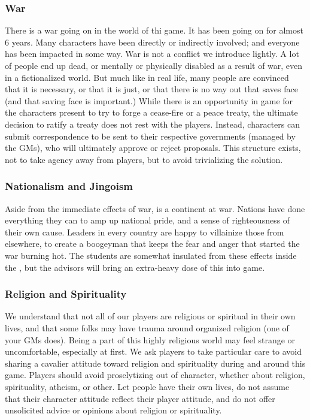 \documentclass[sheet]{GL2020}
\begin{document}
\subsubsection{War}
There is a war going on in the world of thi game. It has been going on for almost 6 years. Many characters have been directly or indirectly involved; and everyone has been impacted in some way. War is not a conflict we introduce lightly. A lot of people end up dead, or mentally or physically disabled as a result of war, even in a fictionalized world. But much like in real life, many people are convinced that it is necessary, or that it is just, or that there is no way out that saves face (and that saving face is important.) While there is an opportunity in game for the characters present to try to forge a cease-fire or a peace treaty, the ultimate decision to ratify a treaty does not rest with the players. Instead, characters can submit correspondence to be sent to their respective governments (managed by the GMs), who will ultimately approve or reject proposals. This structure exists, not to take agency away from players, but to avoid trivializing the solution. 

\subsubsection{Nationalism and Jingoism}
Aside from the immediate effects of war, \pEarth{} is a continent at war. Nations have done everything they can to amp up national pride, and a sense of righteousness of their own cause. Leaders in every country are happy to villainize those from elsewhere, to create a boogeyman that keeps the fear and anger that started the war burning hot. The students are somewhat insulated from these effects inside the \pSchool{}, but the advisors will bring an extra-heavy dose of this into game.

\subsubsection{Religion and Spirituality}
We understand that not all of our players are religious or spiritual in their own lives, and that some folks may have trauma around organized religion (one of your GMs does). Being a part of this highly religious world may feel strange or uncomfortable, especially at first. We ask players to take particular care to avoid sharing a cavalier attitude toward religion and spirituality during and around this game. Players should avoid proselytizing out of character, whether about religion, spirituality, atheism, or other. Let people have their own lives, do not assume that their character attitude reflect their player attitude, and do not offer unsolicited advice or opinions about religion or spirituality.
\end{document}
